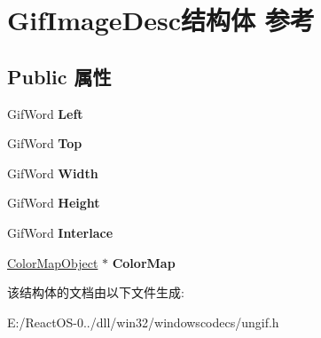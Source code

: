 \hypertarget{struct_gif_image_desc}{}\section{Gif\+Image\+Desc结构体 参考}
\label{struct_gif_image_desc}
\subsection*{Public 属性}
\begin{DoxyCompactItemize}
\item 
\mbox{\label{struct_gif_image_desc_a4ed3428dddc52ea8a92c03a0ee3336ac}} 
Gif\+Word {\bfseries Left}
\item 
\mbox{\label{struct_gif_image_desc_a3ebba069fd37d8cf7ab3a135f577696f}} 
Gif\+Word {\bfseries Top}
\item 
\mbox{\label{struct_gif_image_desc_a95f0b77459f6cbcb9fc885039d81fbb6}} 
Gif\+Word {\bfseries Width}
\item 
\mbox{\label{struct_gif_image_desc_ae916f47edd485a09cc47ef494b962d1f}} 
Gif\+Word {\bfseries Height}
\item 
\mbox{\label{struct_gif_image_desc_a3de2320e6d139958e052246422721f38}} 
Gif\+Word {\bfseries Interlace}
\item 
\mbox{\label{struct_gif_image_desc_a335d87f0fb76c1308623f81c0e890fe3}} 
\hyperlink{struct_color_map_object}{Color\+Map\+Object} $\ast$ {\bfseries Color\+Map}
\end{DoxyCompactItemize}


该结构体的文档由以下文件生成\+:\begin{DoxyCompactItemize}
\item 
E\+:/\+React\+O\+S-\/0../dll/win32/windowscodecs/ungif.\+h\end{DoxyCompactItemize}
